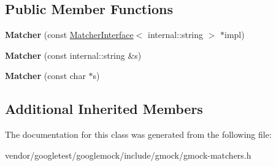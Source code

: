 \subsection*{Public Member Functions}
\begin{DoxyCompactItemize}
\item 
{\bfseries Matcher} (const \hyperlink{classtesting_1_1MatcherInterface}{Matcher\+Interface}$<$ internal\+::string $>$ $\ast$impl)\hypertarget{classtesting_1_1Matcher_3_01internal_1_1string_01_4_a03a7b1b4a93b762685e2f46d6255d493}{}\label{classtesting_1_1Matcher_3_01internal_1_1string_01_4_a03a7b1b4a93b762685e2f46d6255d493}

\item 
{\bfseries Matcher} (const internal\+::string \&s)\hypertarget{classtesting_1_1Matcher_3_01internal_1_1string_01_4_ae2d21038e4dcc25776187d8bff1665f3}{}\label{classtesting_1_1Matcher_3_01internal_1_1string_01_4_ae2d21038e4dcc25776187d8bff1665f3}

\item 
{\bfseries Matcher} (const char $\ast$s)\hypertarget{classtesting_1_1Matcher_3_01internal_1_1string_01_4_a65f1d7616edb049ac059ad5d3fa2d625}{}\label{classtesting_1_1Matcher_3_01internal_1_1string_01_4_a65f1d7616edb049ac059ad5d3fa2d625}

\end{DoxyCompactItemize}
\subsection*{Additional Inherited Members}


The documentation for this class was generated from the following file\+:\begin{DoxyCompactItemize}
\item 
vendor/googletest/googlemock/include/gmock/gmock-\/matchers.\+h\end{DoxyCompactItemize}
